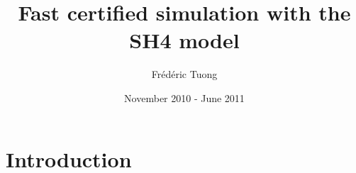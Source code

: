 \documentclass[a4paper, 11pt]{article}
\author{Frédéric Tuong}
\title{Fast certified simulation with the SH4 model}
\date{November 2010 - June 2011}
\newcommand{\simsoc}{SimSoC\xspace}
\newcommand{\SScert}{SimSoC-Cert\xspace}
\begin{document}
\maketitle
\tableofcontents
\section{Introduction}

\end{document}
